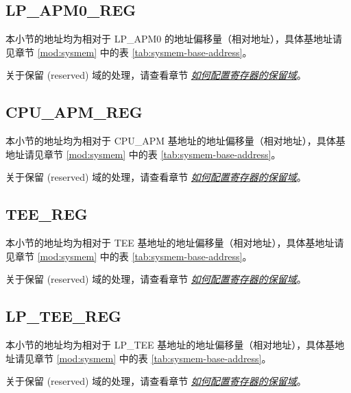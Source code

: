 \documentclass[main\_\_CN.tex]{subfiles}
\begin{document}


\subsection{LP\_APM0\_REG}

本小节的地址均为相对于 LP\_APM0 的地址偏移量（相对地址），具体基地址请见章节 \ref{mod:sysmem} \textit{} 中的表 \ref{tab:sysmem-base-address}。

关于保留 (reserved) 域的处理，请查看章节 \hyperref[programming-reserved-field]{\textit{如何配置寄存器的保留域}}。



\subsection{CPU\_APM\_REG}

本小节的地址均为相对于 CPU\_APM 基地址的地址偏移量（相对地址），具体基地址请见章节 \ref{mod:sysmem} \textit{} 中的表 \ref{tab:sysmem-base-address}。

关于保留 (reserved) 域的处理，请查看章节 \hyperref[programming-reserved-field]{\textit{如何配置寄存器的保留域}}。



\subsection{TEE\_REG}

本小节的地址均为相对于 TEE 基地址的地址偏移量（相对地址），具体基地址请见章节 \ref{mod:sysmem} \textit{} 中的表 \ref{tab:sysmem-base-address}。

关于保留 (reserved) 域的处理，请查看章节 \hyperref[programming-reserved-field]{\textit{如何配置寄存器的保留域}}。



\subsection{LP\_TEE\_REG}

本小节的地址均为相对于 LP\_TEE 基地址的地址偏移量（相对地址），具体基地址请见章节 \ref{mod:sysmem} \textit{} 中的表 \ref{tab:sysmem-base-address}。

关于保留 (reserved) 域的处理，请查看章节 \hyperref[programming-reserved-field]{\textit{如何配置寄存器的保留域}}。


\end{document}
